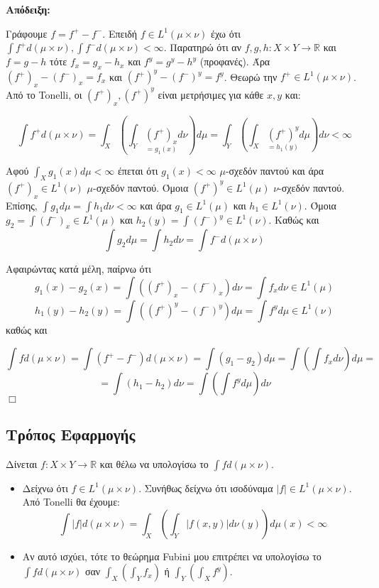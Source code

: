 \textbf{Απόδειξη:} $ $

    
    Γράφουμε $f = f^+ - f^-$. Επειδή $f \in L^1 (\mu \times \nu)$ έχω ότι $\int f^+ d(\mu \times \nu), \int f^- d(\mu \times \nu) < \infty$. Παρατηρώ ότι αν $f,g,h : X\times Y \rightarrow \mathbb R$ και $f = g-h$ τότε $f_x = g_x - h_x$ και $f^y = g^y - h^y$ (προφανές). Άρα $(f^+)_x - (f^-)_x = f_x$ και $(f^+)^y - (f^-)^y = f^y$. Θεωρώ την $f^+ \in L^1 (\mu \times \nu)$. Από το Tonelli, οι $(f^+)_x, (f^+)^y$ είναι μετρήσιμες για κάθε $x,y$ και:
    
    $$ \int f^+ d(\mu \times \nu) = \int_X \left( \int_Y \underset{= g_1(x)}{(f^+)_x} d\nu \right) d\mu = \int_Y \left( \int_X \underset{=h_1(y)}{(f^+)^y} d\mu \right)  d\nu < \infty$$

    
    Αφού $\int_X g_1(x) d\mu < \infty$ έπεται ότι $g_1(x) < \infty$ $\mu$-σχεδόν παντού και άρα $(f^+)_x \in L^1 (\nu)$ $\mu$-σχεδόν παντού. Όμοια $(f^+)^y \in L^1 (\mu)$ $\nu$-σχεδόν παντού. Επίσης, $\int g_1 d\mu = \int h_1 d\nu < \infty$ και άρα $g_1 \in L^1(\mu)$ και $h_1 \in L^1(\nu)$. Όμοια $g_2 = \int (f^-)_x \in L^1(\mu)$ και $h_2(y) = \int (f^-)^y \in L^1 (\nu)$. Καθώς και 
    $$\int g_2 d\mu = \int h_2 d\nu = \int f^- d(\mu\times \nu)$$

    
    Αφαιρώντας κατά μέλη, παίρνω ότι 
    $$g_1(x) - g_2(x) = \int \left((f^+)_x - (f^-)_x  \right) d\nu = \int f_x d\nu \in L^1(\mu)$$
    $$h_1(y) - h_2(y) = \int \left((f^+)^y - (f^-)^y \right) d\mu = \int f^y d\mu \in L^1(\nu)$$ καθώς και 

    $$ \int f d(\mu \times \nu) = \int \left(f^+ - f^-\right) d(\mu \times \nu) = \int (g_1 - g_2) d\mu = \int \left(\int f_x d\nu\right) d\mu = $$
    $$ = \int (h_1 - h_2)d\nu  = \int \left( \int f^y d\mu \right) d\nu$$
\hfill $\Box$

\subsection{Τρόπος Εφαρμογής}


Δίνεται $f :X \times Y \rightarrow \mathbb R$ και θέλω να υπολογίσω το $\int fd(\mu \times \nu)$.
\begin{itemize}
    \item Δείχνω ότι $f \in L^1 (\mu \times \nu)$. Συνήθως δείχνω ότι ισοδύναμα $|f| \in L^1 (\mu \times \nu)$. Από Tonelli θα έχουμε:
    $$ \int |f| d(\mu \times \nu) = \int_X \left( \int_Y |f(x,y)| d\nu(y)\right) d\mu(x) < \infty $$

    \item Αν αυτό ισχύει, τότε το θεώρημα Fubini μου επιτρέπει να υπολογίσω το $\int f d(\mu \times \nu)$ σαν $\int_X \left(\int_Y f_x \right)$ ή $\int_{Y} \left(\int_X f^y \right)$.
    
\end{itemize}

